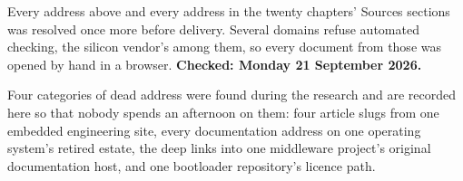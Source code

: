 Every address above and every address in the twenty chapters' Sources sections
was resolved once more before delivery. Several domains refuse automated
checking, the silicon vendor's among them, so every document from those was
opened by hand in a browser. \textbf{Checked: Monday 21 September 2026.}

Four categories of dead address were found during the research and are recorded
here so that nobody spends an afternoon on them: four article slugs from one
embedded engineering site, every documentation address on one operating system's
retired estate, the deep links into one middleware project's original
documentation host, and one bootloader repository's licence path.
